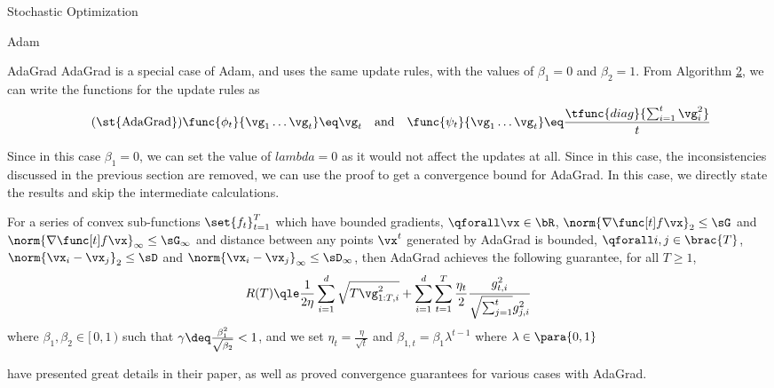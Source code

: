 \documentclass{article}
\begin{document}
\begin{psection}{Stochastic Optimization}
\begin{psubsection}{Adam}
	\end{psubsection}

	\begin{psubsection}{AdaGrad}
		AdaGrad \citep{adagrad} is a special case of Adam, and uses the same update rules, with the values of $\beta_1 = 0$ and $\beta_2 = 1$. From Algorithm \hyperlink{algo:2}{2}, we can write the functions for the update rules as
		\begin{align*}
			\tag{\st{AdaGrad}}
			\func{\phi_t}{\vg_1 \dots \vg_t} \eq \vg_t \quad\text{and}\quad	\func{\psi_t}{\vg_1 \dots \vg_t} \eq \frac{\tfunc{diag}{\sum_{i = 1}^t \vg_i^2}}{t}
		\end{align*}

		Since in this case $\beta_1 = 0$, we can set the value of $lambda = 0$ as it would not affect the updates at all. Since in this case, the inconsistencies discussed in the previous section are removed, we can use the proof to get a convergence bound for AdaGrad. In this case, we directly state the results and skip the intermediate calculations.

		\begin{theorem}
			For a series of convex sub-functions $\set{f_t}_{t = 1}^T$ which have bounded gradients, \ie $\qforall \vx \in \bR$, $\norm{\ggf[t]}_2 \le \sG$ and $\norm{\ggf[t]}_{\infty} \le \sG_{\infty}$ and distance between any points $\vx^t$ generated by AdaGrad is bounded, \ie $\qforall i, j \in \brac{T}$, $\norm{\vx_i - \vx_j}_2 \le \sD$ and $\norm{\vx_i - \vx_j}_{\infty} \le \sD_{\infty}$, then AdaGrad achieves the following guarantee, for all $T \ge 1$,
			\begin{align*}
				R(T) \qle \frac{1}{2 \eta} \sum_{i = 1}^d \sqrt{T \vg_{1:T, i}^2} + \sum_{i = 1}^d \sum_{t = 1}^T \frac{\eta_t}{2} \frac{g_{t, i}^2}{\sqrt{\sum_{j = 1}^t} g_{j, i}^2}
			\end{align*}
			where $\beta_1, \beta_2 \in [\,0, 1\,)$ such that $\gamma \deq \frac{\beta_1^2}{\sqrt{\beta_2}} < 1$, and we set $\eta_t = \frac{\eta}{\sqrt{t}}$ and $\beta_{1, t} = \beta_1 \lambda^{t - 1}$ where $\lambda \in \para{0, 1}$
			\label{th:adagrad-regret}
		\end{theorem}
		
		\begin{remark}
			\cite{adagrad} have presented great details in their paper, as well as proved convergence guarantees for various cases with AdaGrad.
		\end{remark}
	\end{psubsection}

\end{psection}
\end{document}
